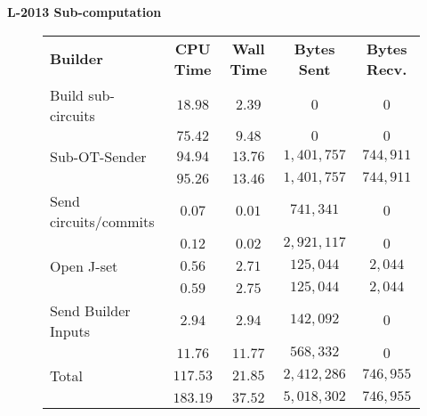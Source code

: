 \documentclass[ %
                    author={Nicholas Tutte},
                supervisor={Prof. Nigel Smart},
                    degree={MEng},
                     title={Secure Two Party Computation},
                  subtitle={A practical comparison of recent protocols},
                      type={Research - GG1K},
                      year={2015} ]{dissertation}
\begin{document}
					\noindent \textbf{L-2013 Sub-computation}\\
					\begin{figure}[!ht]
						\begin{tabular}{| p{4.3cm} | c c c c |}
							\hline
							\textbf{Builder} & \textbf{CPU Time} & \textbf{Wall Time} & \textbf{Bytes Sent} & \textbf{Bytes Recv.} \\
							\thickhline
							Build sub-circuits & $18.98$ & $2.39$ & $0$ & $0$ \\
									   & $75.42$ & $9.48$ & $0$ & $0$ \\
							\hline
							Sub-OT-Sender & $94.94$ & $13.76$ & $1,401,757$ & $744,911$ \\
								      & $95.26$ & $13.46$ & $1,401,757$ & $744,911$ \\
							\hline
							Send circuits/commits & $0.07$ & $0.01$ & $741,341$ & $0$ \\
									      & $0.12$ & $0.02$ & $2,921,117$ & $0$ \\
							\hline
							Open J-set & $0.56$ & $2.71$ & $125,044$ & $2,044$ \\
								   & $0.59$ & $2.75$ & $125,044$ & $2,044$ \\
							\hline
							Send Builder Inputs & $2.94$ & $2.94$ & $142,092$ & $0$ \\
									    & $11.76$ & $11.77$ & $568,332$ & $0$ \\
							\thickhline
							Total & $117.53$ & $21.85$ & $2,412,286$ & $746,955$ \\
							      & $183.19$ & $37.52$ & $5,018,302$ & $746,955$ \\
							\hline
						\end{tabular}

					\vspace{0.2cm}


\end{figure}
\end{document}
